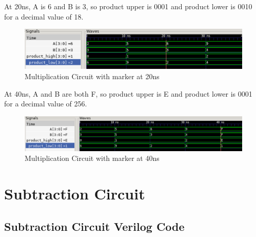 \documentclass[12pt]{article}
\begin{document}
At 20ns, A is 6 and B is 3, so product upper is 0001 and product lower is 0010 for a decimal value of 18.  
 \begin{figure}[H]
 \centering 
\includegraphics[width = 1.0\textwidth]{Multiplication/multiplication_wave1.png}
 \caption{Multiplication Circuit with marker at 20ns}
 \label{fig:enter-label}
 \end{figure}

 At 40ns, A and B are both F, so product upper is E and product lower is 0001 for a decimal value of 256.
 \begin{figure}[H]
 \centering 
\includegraphics[width = 1.0\textwidth]{Multiplication/multiplication_wave2.png}
 \caption{Multiplication Circuit with marker at 40ns}
 \label{fig:enter-label}
 \end{figure}

\section{Subtraction Circuit}
\subsection{Subtraction Circuit Verilog Code} 
 


\end{document}
